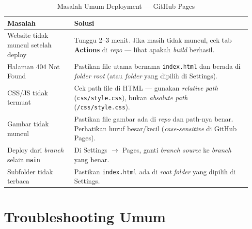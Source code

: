\begin{table}[htbp]
\centering
\caption{Masalah Umum Deployment --- GitHub Pages}
\label{tab:troubleshooting-deploy}
\small
\begin{tabular}{@{}p{5.5cm}p{8cm}@{}}
\toprule
\textbf{Masalah} & \textbf{Solusi} \\
\midrule
Website tidak muncul setelah deploy & Tunggu 2--3 menit. Jika masih tidak muncul, cek tab \textbf{Actions} di \emph{repo} --- lihat apakah \emph{build} berhasil. \\
Halaman 404 Not Found & Pastikan file utama bernama \texttt{index.html} dan berada di \emph{folder root} (atau \emph{folder} yang dipilih di Settings). \\
CSS/JS tidak termuat & Cek path file di HTML --- gunakan \emph{relative path} (\texttt{css/style.css}), bukan \emph{absolute path} (\texttt{/css/style.css}). \\
Gambar tidak muncul & Pastikan file gambar ada di \emph{repo} dan path-nya benar. Perhatikan huruf besar/kecil (\emph{case-sensitive} di GitHub Pages). \\
Deploy dari \emph{branch} selain \texttt{main} & Di Settings $\rightarrow$ Pages, ganti \emph{branch source} ke \emph{branch} yang benar. \\
Subfolder tidak terbaca & Pastikan \texttt{index.html} ada di \emph{root folder} yang dipilih di Settings. \\
\bottomrule
\end{tabular}
\end{table}

\section{Troubleshooting Umum}
\label{sec:troubleshooting-umum}

